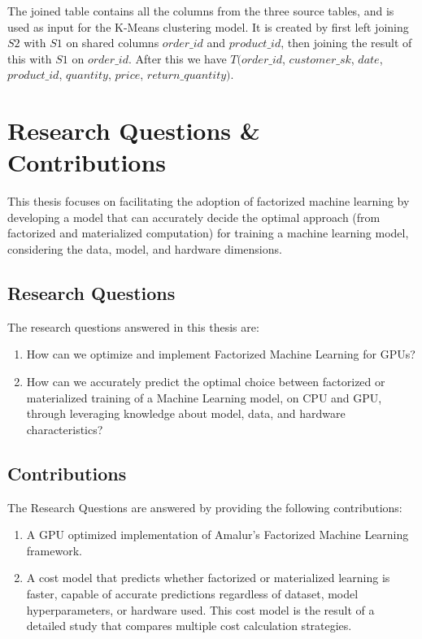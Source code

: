 The joined table contains all the columns from the three source tables, and is used as input for the K-Means clustering model. It is created by first left joining $S2$ with $S1$ on shared columns $order\_id$ and $product\_id$, then joining the result of this with $S1$ on $order\_id$. After this we have $T(order\_id$, $customer\_sk$, $date$, $product\_id$, $quantity$, $price$, $return\_quantity)$.

\section{Research Questions \& Contributions}
This thesis focuses on facilitating the adoption of factorized machine learning by developing a model that can accurately decide the optimal approach (from factorized and materialized computation) for training a machine learning model, considering the data, model, and hardware dimensions.

\subsection{Research Questions}
The research questions answered in this thesis are:
\begin{enumerate}[leftmargin=1.5cm, label=\emph{RQ.\arabic*}]
  \item How can we optimize and implement Factorized Machine Learning for GPUs?
  \item How can we accurately predict the optimal choice between factorized or materialized training of a Machine Learning model, on CPU and GPU, through leveraging knowledge about model, data, and hardware characteristics?
\end{enumerate}

\subsection{Contributions}
The Research Questions are answered by providing the following contributions:
\begin{enumerate}[leftmargin=1.5cm, label=\emph{C.\arabic*}]
  \item A GPU optimized implementation of Amalur's Factorized Machine Learning framework.
  \item A cost model that predicts whether factorized or materialized learning is faster, capable of accurate predictions regardless of dataset, model hyperparameters, or hardware used. This cost model is the result of a detailed study that compares multiple cost calculation strategies.
\end{enumerate}

